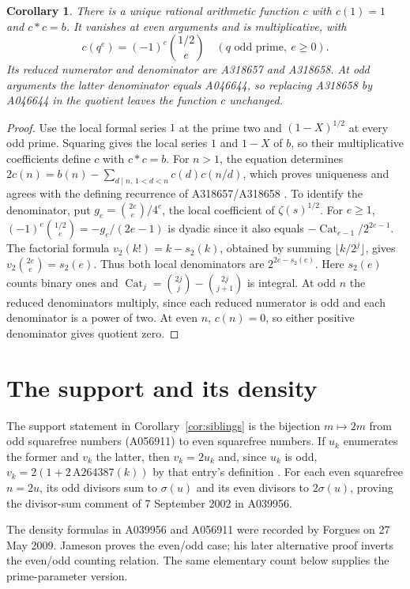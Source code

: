 \documentclass[11pt]{article}
\newtheorem{corollary}[theorem]{Corollary}
\begin{document}
\begin{corollary}\label{cor:root}
There is a unique rational arithmetic function $c$ with $c(1)=1$ and
$c*c=b$. It vanishes at even arguments and is multiplicative, with
\[
 c(q^e)=(-1)^e\binom{1/2}{e}\quad(q\text{ odd prime},\ e\geq0).
\]
Its reduced numerator and denominator are A318657 and A318658.
At odd arguments the latter denominator equals A046644, so replacing
A318658 by A046644 in the quotient leaves the function $c$ unchanged.
\end{corollary}
\begin{proof}
Use the local formal series $1$ at the prime two and $(1-X)^{1/2}$
at every odd prime. Squaring gives the local series $1$ and $1-X$
of $b$, so their multiplicative coefficients define $c$ with $c*c=b$.
For $n>1$, the equation determines
$2c(n)=b(n)-\sum_{d\mid n,\,1<d<n}c(d)c(n/d)$, which proves
uniqueness and agrees with the defining recurrence of A318657/A318658
\cite{root}. To identify the denominator, put
$g_e=\binom{2e}{e}/4^e$, the local coefficient of $\zeta(s)^{1/2}$.
For $e\geq1$, $(-1)^e\binom{1/2}{e}=-g_e/(2e-1)$ is dyadic
since it also equals $-\operatorname{Cat}_{e-1}/2^{2e-1}$.
The factorial formula $v_2(k!)=k-s_2(k)$, obtained by summing
$\lfloor k/2^j\rfloor$, gives $v_2\binom{2e}{e}=s_2(e)$.
Thus both local denominators are $2^{2e-s_2(e)}$.
Here $s_2(e)$ counts binary ones and
$\operatorname{Cat}_j=\binom{2j}{j}-\binom{2j}{j+1}$ is integral.
At odd $n$ the reduced denominators multiply, since each reduced
numerator is odd and each denominator is a power of two. At even $n$,
$c(n)=0$, so either positive denominator gives quotient zero.
\end{proof}

\section{The support and its density}
The support statement in Corollary~\ref{cor:siblings} is the bijection
$m\mapsto2m$ from odd squarefree numbers (A056911) to even squarefree
numbers. If $u_k$ enumerates the former and $v_k$ the latter, then
$v_k=2u_k$ and, since $u_k$ is odd,
$v_k=2(1+2\,\mathrm{A264387}(k))$ by that entry's definition
\cite{support,odd-support}. For each even squarefree $n=2u$, its odd
divisors sum to $\sigma(u)$ and its even divisors to $2\sigma(u)$,
proving the divisor-sum comment of 7 September 2002 in A039956.

The density formulas in A039956 and A056911 were recorded by
Forgues on 27 May 2009. Jameson \cite{jameson} proves the even/odd
case; his later alternative proof \cite{jameson-later} inverts the
even/odd counting relation. The same elementary count below supplies
the prime-parameter version.
\end{document}

